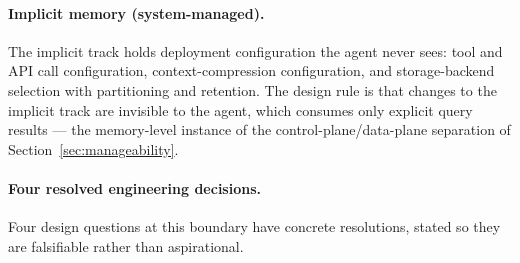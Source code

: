 \documentclass[11pt]{article}
\begin{document}
\paragraph{Implicit memory (system-managed).}
The implicit track holds deployment configuration the agent never sees: tool and API call configuration, context-compression configuration, and storage-backend selection with partitioning and retention. The design rule is that changes to the implicit track are invisible to the agent, which consumes only explicit query results --- the memory-level instance of the control-plane/data-plane separation of Section~\ref{sec:manageability}.

\paragraph{Four resolved engineering decisions.}
Four design questions at this boundary have concrete resolutions, stated so they are falsifiable rather than aspirational.
\end{document}
